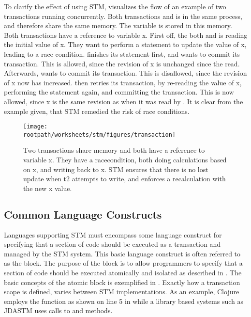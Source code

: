 To clarify the effect of using \ac{STM},  visualizes the flow of an example of two transactions running concurrently. Both transactions  and  is in the same process, and therefore share the same memory. The variable  is stored in this memory. Both transactions have a reference to variable x. First off, the both  and  is reading the initial value of x. They want to perform a statement to update the value of x, leading to a race condition.  finishes its statement first, and wants to commit its transaction. This is allowed, since the revision of x is unchanged since the read. Afterwards,  wants to commit its transaction. This is disallowed, since the revision of x now has increased.  then retries its transaction, by re-reading the value of x, performing the statement again, and committing the transaction. This is now allowed, since x is the same revision as when it was read by . It is clear from the example given, that \ac{STM} remedied the risk of race conditions.

\begin{figure}[h!]
\centering
\texttt{[image: \\rootpath/worksheets/stm/figures/transaction]}
\caption{Two transactions share memory and both have a reference to variable x. They have a racecondition, both doing calculations based on x, and writing back to x. \ac{STM} ensures that there is no lost update when t2 attempts to write, and enforces a recalculation with the new x value.}\label{fig:transaction}
\end{figure}

\subsection{Common Language Constructs}
\label{sec:stm_common_constructs}
Languages supporting \ac{STM} must encompass some language construct for specifying that a section of code should be executed as a transaction and managed by the \ac{STM} system. This basic language construct is often referred to as the  block\cite[p. 49]{harris2005composable}\cite[p. 3]{harris2003language}. The purpose of the  block is to allow programmers to specify that a section of code should be executed atomically and isolated as described in . The basic concepts of the atomic block is exemplified in . Exactly how a transaction scope is defined, varies between \ac{STM} implementations. As an example, Clojure employs the  function as shown on line 5 in  while a library based systems such as JDASTM\cite{ramadan2009committing} uses calls to  and  methods.

